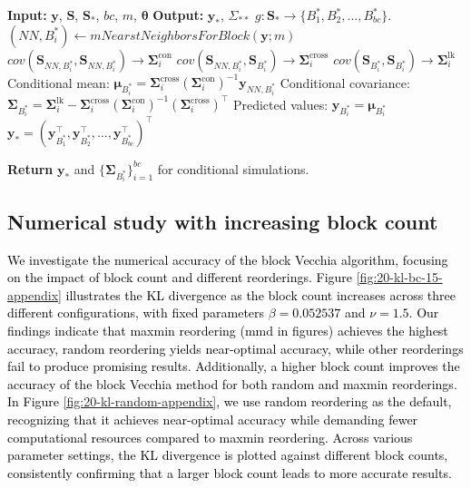 \documentclass[12pt]{article}
\begin{document}
\begin{algorithm}[H]
\caption{Prediction Using Block Vecchia Approximation}
\label{alg:block-vecchia-prediction}
\begin{algorithmic}[1]
\State \textbf{Input:} $\boldsymbol{y}$, $\boldsymbol{S}$, $\boldsymbol{S}_*$, $bc$, $m$, $\boldsymbol{\theta}$
\State \textbf{Output:}  $\boldsymbol{y}_*$, $\Sigma_{**}$
\State
\State  $g: \boldsymbol{S}_* \rightarrow \{ B^*_1, B^*_2, \ldots, B^*_{bc} \}$. 
 
    \State $(NN, B^*_{i}) \gets mNearstNeighborsForBlock(\boldsymbol{y}; m)$
        \State $cov(\boldsymbol{S}_{NN, B^*_i}, \boldsymbol{S}_{NN, B^*_i}) \rightarrow \mathbf{\Sigma}^{\text{con}}_i$  
        \State $cov(\boldsymbol{S}_{NN, B^*_i}, \boldsymbol{S}_{B^*_i}) \rightarrow \mathbf{\Sigma}^{\text{cross}}_i$
        \State $cov(\boldsymbol{S}_{B^*_i}, \boldsymbol{S}_{B^*_i}) \rightarrow \mathbf{\Sigma}^{\text{lk}}_i$
    \State Conditional mean:
    $
    \boldsymbol{\mu}_{B^*_i} = \mathbf{\Sigma}^{\text{cross}}_i \left( \mathbf{\Sigma}^{\text{con}}_i \right)^{-1} \boldsymbol{y}_{NN, B^*_i}
    $
    \State Conditional covariance:
    $
    \mathbf{\Sigma}_{B^*_i} = \mathbf{\Sigma}^{\text{lk}}_i - \mathbf{\Sigma}^{\text{cross}}_i \left( \mathbf{\Sigma}^{\text{con}}_i \right)^{-1} \left( \mathbf{\Sigma}^{\text{cross}}_i \right)^\top
    $
    \State Predicted values: $\boldsymbol{y}_{B^*_i} = \boldsymbol{\mu}_{B^*_i}$
\EndFor
\State $\boldsymbol{y}_* = \left( \boldsymbol{y}_{B^*_1}^\top, \boldsymbol{y}_{B^*_2}^\top, \ldots, \boldsymbol{y}_{B^*_{bc}}^\top \right)^\top$

\State \textbf{Return} $\boldsymbol{y}_*$ and $\{ \mathbf{\Sigma}_{B^*_i} \}_{i=1}^{bc}$ for conditional simulations.
\end{algorithmic}
\end{algorithm}

\subsection{Numerical study with increasing block count}
\label{spp:numerical}

\textcolor{black}{
We investigate the numerical accuracy of the block Vecchia algorithm, focusing on the impact of block count and different reorderings. Figure \ref{fig:20-kl-bc-15-appendix} illustrates the KL divergence as the block count increases across three different configurations, with fixed parameters $\beta=0.052537$ and $\nu=1.5$. Our findings indicate that maxmin reordering (mmd in figures) achieves the highest accuracy, random reordering yields near-optimal accuracy, while other reorderings fail to produce promising results. Additionally, a higher block count improves the accuracy of the block Vecchia method for both random and maxmin reorderings. In Figure \ref{fig:20-kl-random-appendix}, we use random reordering as the default, recognizing that it achieves near-optimal accuracy while demanding fewer computational resources compared to maxmin reordering. Across various parameter settings, the KL divergence is plotted against different block counts, consistently confirming that a larger block count leads to more accurate results.
}
\end{document}
